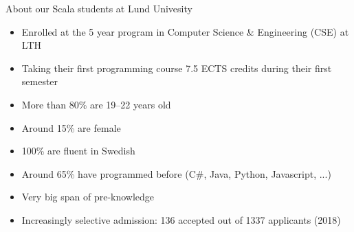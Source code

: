 \documentclass[aspectratio=169]{beamer}
\newenvironment{Slide}[1]%
  {\begin{frame}[environment=Slide]{#1}}
  {\end{frame}}%
\begin{document}
\begin{frame}[plain]
  \begin{figure}
  \centering
  \end{figure}%
  \end{frame}%

\begin{Slide}{About our Scala students at Lund Univesity}
\begin{itemize}
\item Enrolled at the 5 year program in Computer Science \& Engineering (CSE) at LTH
\item Taking their first programming course 7.5 ECTS credits during their first semester
\item More than 80\% are 19--22 years old
\item Around 15\% are female     
\item 100\% are fluent in Swedish
\item Around 65\% have programmed before (C\#, Java, Python, Javascript, ...)
\item Very big span of pre-knowledge
\item Increasingly selective admission: 136 accepted out of 1337 applicants (2018)
\end{itemize}
\end{Slide}
\end{document}
